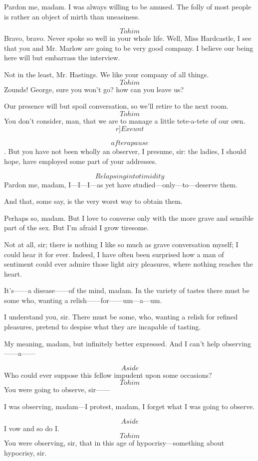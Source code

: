 \documentclass{book}
\begin{document}
\2  Pardon me, madam.  I was always willing to be amused.  The
folly of most people is rather an object of mirth than uneasiness.

\4  \[To him\]  Bravo, bravo.  Never spoke so well in your whole
life.  Well, Miss Hardcastle, I see that you and Mr. Marlow are going
to be very good company.  I believe our being here will but embarrass
the interview.

\2  Not in the least, Mr. Hastings.  We like your company of all
things.  \[To him\]  Zounds!  George, sure you won't go? how can you
leave us?

\4  Our presence will but spoil conversation, so we'll retire to
the next room.  \[To him\]  You don't consider, man, that we are to
manage a little tete-a-tete of our own.  \[r]Exeunt\]

\8  \[after a pause\].  But you have not been wholly an
observer, I presume, sir: the ladies, I should hope, have employed some
part of your addresses.

\2  \[Relapsing into timidity\]  Pardon me, madam, I---I---I---as yet
have studied---only---to---deserve them.

\8  And that, some say, is the very worst way to obtain them.

\2  Perhaps so, madam.  But I love to converse only with the more
grave and sensible part of the sex.  But I'm afraid I grow tiresome.

\8  Not at all, sir; there is nothing I like so much as
grave conversation myself; I could hear it for ever.  Indeed, I have
often been surprised how a man of sentiment could ever admire those
light airy pleasures, where nothing reaches the heart.

\2  It's------a disease------of the mind, madam.  In the variety of
tastes there must be some who, wanting a relish------for------um---a---um.

\8  I understand you, sir.  There must be some, who,
wanting a relish for refined pleasures, pretend to despise what they
are incapable of tasting.

\2  My meaning, madam, but infinitely better expressed.  And I
can't help observing------a------

\8  \[Aside\]  Who could ever suppose this fellow
impudent upon some occasions?  \[To him\]  You were going to observe,
sir------

\2  I was observing, madam---I protest, madam, I forget what I was
going to observe.

\8  \[Aside\]  I vow and so do I.  \[To him\]  You were
observing, sir, that in this age of hypocrisy---something about
hypocrisy, sir.
\end{document}
